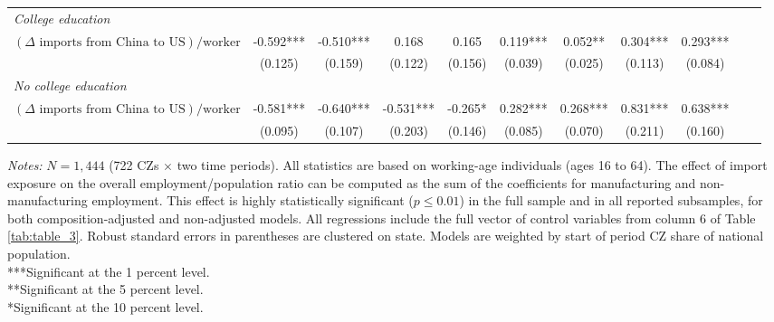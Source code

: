 \begin{frame}
\begin{table}[ht]
{\begin{tabular}{lcccccccccc}
\textit{College education} \\
$(\Delta \text{ imports from China to US})/\text{worker}$ 
                & -0.592*** & -0.510*** & 0.168      & 0.165      & 0.119*** & 0.052**  & 0.304*** & 0.293*** \\
                & (0.125)   & (0.159)   & (0.122)    & (0.156)    & (0.039)  & (0.025)  & (0.113)  & (0.084)  \\
\textit{No college education} \\
$(\Delta \text{ imports from China to US})/\text{worker}$ 
                & -0.581*** & -0.640*** & -0.531***  & -0.265*    & 0.282*** & 0.268*** & 0.831*** & 0.638*** \\
                & (0.095)   & (0.107)   & (0.203)    & (0.146)    & (0.085)  & (0.070)  & (0.211)  & (0.160)  \\
                \bottomrule
            \end{tabular}
        }
        \vspace{0.2cm}
        
        \begin{minipage}{\linewidth}
            \tiny
            \textit{Notes:} $N = 1,444$ (722 CZs $\times$ two time periods). All statistics are based on working-age individuals (ages 16 to 64). The effect of import exposure on the overall employment/population ratio can be computed as the sum of the coefficients for manufacturing and non-manufacturing employment. This effect is highly statistically significant ($p \leq 0.01$) in the full sample and in all reported subsamples, for both composition-adjusted and non-adjusted models. All regressions include the full vector of control variables from column 6 of Table \ref{tab:table_3}. Robust standard errors in parentheses are clustered on state. Models are weighted by start of period CZ share of national population. \\
            ***Significant at the 1 percent level. \\
            **Significant at the 5 percent level. \\
            *Significant at the 10 percent level.
        \end{minipage}
    \end{table}
\end{frame}